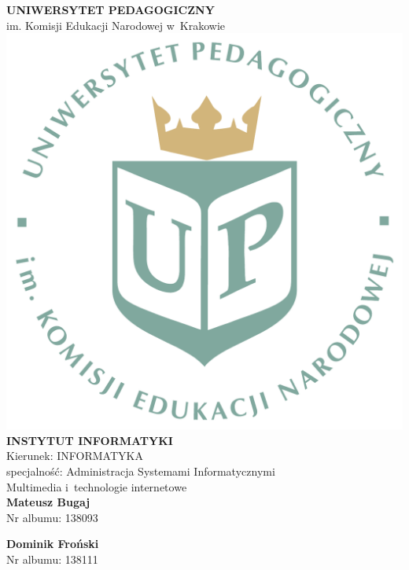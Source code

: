 \documentclass[12pt,a4paper,oneside]{book}
\theoremstyle{definition}
\numberwithin{equation}{chapter}
\begin{document}

\begin{titlepage}
\begin{center}

{\Large \textbf{UNIWERSYTET PEDAGOGICZNY}}\\[0.2cm]
{\Large im. Komisji Edukacji Narodowej w~Krakowie}\\[1cm]

\includegraphics[scale=0.25]{images/logoUP_PL.pdf}\\[1cm]
{\large \textbf{INSTYTUT INFORMATYKI}}\\[0.2cm]
Kierunek: INFORMATYKA\\[0.2cm]
specjalność: Administracja Systemami Informatycznymi\\[0.2cm]
Multimedia i~technologie internetowe\\[0.5cm]


{\Large \textbf{Mateusz Bugaj} \\[0.2cm] }
{\large Nr albumu: 138093 \\[0.2cm]}

{\Large \textbf{Dominik Froński} \\[0.2cm] }
{\large Nr albumu: 138111 \\[0.2cm]}


\end{center}
\end{titlepage}
\end{document}
